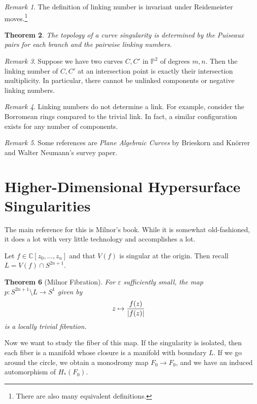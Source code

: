 \documentclass[leqno, openany]{memoir}
\newtheorem{thm}{Theorem}[chapter]
\theoremstyle{definition}
\theoremstyle{remark}
\newtheorem{rmk}[thm]{Remark}
\theoremstyle{plain}
\theoremstyle{definition}
\theoremstyle{remark}
\renewcommand{\C}{\mathbb{C}}
\renewcommand{\P}{\mathbb{P}}
\newcommand{\ep}{\varepsilon}
\begin{document}
\begin{rmk}
    The definition of linking number is invariant under Reidemeister moves.\footnote{There are also many equivalent definitions.}
\end{rmk}

\begin{thm}
    The topology of a curve singularity is determined by the Puiseaux pairs for each branch and the pairwise linking numbers.
\end{thm}

\begin{rmk}
    Suppose we have two curves $C, C'$ in $\P^2$ of degrees $m, n$. Then the linking number of $C, C'$ at an intersection point is exactly their intersection multiplicity. In particular, there cannot be unlinked components or negative linking numbers.
\end{rmk}

\begin{rmk}
    Linking numbers do not determine a link. For example, consider the Borromean rings compared to the trivial link. In fact, a similar configuration exists for any number of components.
\end{rmk}

\begin{rmk}
    Some references are \textit{Plane Algebraic Curves} by Brieskorn and Kn\"orrer and Walter Neumann's survey paper.
\end{rmk}

\section{Higher-Dimensional Hypersurface Singularities}%
\label{sec:higher_dimensional_hypersurface_singularities}

The main reference for this is Milnor's book. While it is somewhat old-fashioned, it does a lot with very little technology and accomplishes a lot.

Let $f \in \C[z_0, \ldots, z_n]$ and that $V(f)$ is singular at the origin. Then recall $L = V(f) \cap S^{2n+1}$.

\begin{thm}[Milnor Fibration]
    For $\ep$ sufficiently small, the map $p: S^{2n+1} \setminus {L} \to S^1$ given by
    \[ z \mapsto \frac{f(z)}{\abs{f(z)}} \] 
    is a locally trivial fibration.
\end{thm}

Now we want to study the fiber of this map. If the singularity is isolated, then each fiber is a manifold whose closure is a manifold with boundary $L$. If we go around the circle, we obtain a monodromy map $F_0 \to F_0$, and we have an induced automorphism of $H_*(F_0)$.
\end{document}
